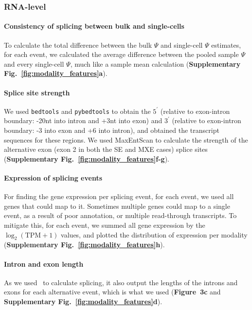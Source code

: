 \subsubsection{RNA-level}

\paragraph{Consistency of splicing between bulk and single-cells}
To calculate the total difference between the bulk $\Psi$ and single-cell $\Psi$ estimates, for each event, we calculated the average difference between the pooled sample $\Psi$ and every single-cell $\Psi$, much like a sample mean calculation (\textbf{Supplementary Fig.~\ref{fig:modality_features}a}).

\paragraph{Splice site strength}
We used \texttt{bedtools}\cite{Quinlan:2010kma} and \texttt{pybedtools}\cite{Dale:2011cl} to obtain the $5^\prime$ (relative to exon-intron boundary: -20nt into intron and +3nt into exon) and $3^\prime$ (relative to exon-intron boundary: -3 into exon and +6 into intron), and obtained the transcript sequences for these regions. We used MaxEntScan\cite{Yeo:2004fg} to calculate the strength of the alternative exon (exon 2 in both the SE and MXE cases) splice sites (\textbf{Supplementary Fig.~\ref{fig:modality_features}f-g}).

\paragraph{Expression of splicing events}
For finding the gene expression per splicing event, for each event, we used all genes that could map to it. Sometimes multiple genes could map to a single event, as a result of poor annotation, or multiple read-through transcripts. To mitigate this, for each event, we summed all gene expression by the $\log_2(\mathrm{TPM}+1)$ values, and plotted the distribution of expression per modality (\textbf{Supplementary Fig.~\ref{fig:modality_features}h}).

\paragraph{Intron and exon length}
As we used \outrigger\, to calculate splicing, it also output the lengths of the introns and exons for each alternative event, which is what we used (\textbf{Figure~3c} and \textbf{Supplementary Fig.~\ref{fig:modality_features}d}).


